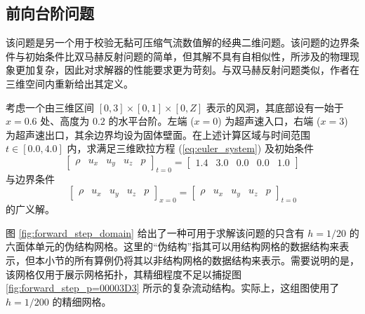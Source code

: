 \newpage{}

\subsection{前向台阶问题}

该问题是另一个用于校验无黏可压缩气流数值解的经典二维问题。该问题的边界条件与初始条件比双马赫反射问题的简单，但其解不具有自相似性，所涉及的物理现象更加复杂，因此对求解器的性能要求更为苛刻。与双马赫反射问题类似，作者在三维空间内重新给出其定义。
\begin{problem}
[前向台阶]\label{prob:=00524D=005411=0053F0=009636}考虑一个由三维区间
$[0,3]\times[0,1]\times[0,Z]$ 表示的风洞，其底部设有一始于 $x=0.6$ 处、高度为 $0.2$
的水平台阶。左端 ($x=0$) 为超声速入口，右端 ($x=3$) 为超声速出口，其余边界均设为固体壁面。在上述计算区域与时间范围
$t\in[0.0,4.0]$ 内，求满足三维欧拉方程 (\ref{eq:euler_system}) 及初始条件
\begin{equation}
\begin{bmatrix}\rho & u_{x} & u_{y} & u_{z} & p\end{bmatrix}_{t=0}=\begin{bmatrix}1.4 & 3.0 & 0.0 & 0.0 & 1.0\end{bmatrix}
\end{equation}
与边界条件
\begin{equation}
\begin{bmatrix}\rho & u_{x} & u_{y} & u_{z} & p\end{bmatrix}_{x=0}=\begin{bmatrix}\rho & u_{x} & u_{y} & u_{z} & p\end{bmatrix}_{t=0}
\end{equation}
的广义解。
\end{problem}

图 \ref{fig:forward_step_domain} 给出了一种可用于求解该问题的只含有 $h=1/20$ 的六面体单元的伪结构网格。这里的“伪结构”指其可以用结构网格的数据结构来表示，但本小节的所有算例仍将其以非结构网格的数据结构来表示。需要说明的是，该网格仅用于展示网格拓扑，其精细程度不足以捕捉图
\ref{fig:forward_step_p=00003D3} 所示的复杂流动结构。实际上，这组图使用了 $h=1/200$
的精细网格。

